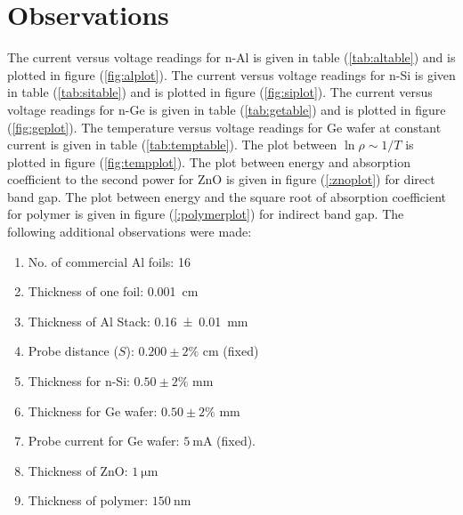 \documentclass[%
 aip,
 amsmath,amssymb,
 reprint,%
]{revtex4-1}
\begin{document}
\section{Observations}
The current versus voltage readings for n-Al is given in table (\ref{tab:altable}) and is plotted in figure (\ref{fig:alplot}). The current versus voltage readings for n-Si is given in table (\ref{tab:sitable}) and is plotted in figure (\ref{fig:siplot}). The current versus voltage readings for n-Ge is given in table (\ref{tab:getable}) and is plotted in figure (\ref{fig:geplot}). The temperature versus voltage readings for Ge wafer at constant current is given in table (\ref{tab:temptable}). The plot between $\ln \rho \sim 1/T$ is plotted in figure (\ref{fig:tempplot}). The plot between energy and absorption coefficient to the second power for ZnO is given in figure (\ref{:znoplot}) for direct band gap. The plot between energy and the square root of absorption coefficient for polymer is given in figure (\ref{:polymerplot}) for indirect band gap. The following additional observations were made:
\begin{enumerate}
    \item No. of commercial Al foils: 16
    \item Thickness of one foil: \SI{0.001}{\centi \metre}
    \item Thickness of Al Stack: \SI[separate-uncertainty=true]{0.16 \pm 0.01}{\milli \metre}
    \item Probe distance ($S$): $0.200 \pm 2\%$ cm (fixed)
    \item Thickness for n-Si: $0.50 \pm 2\%$ mm
    \item Thickness for Ge wafer: $0.50 \pm 2\%$ mm
    \item Probe current for Ge wafer: $\SI{5}{\milli \ampere}$ (fixed).
    \item Thickness of ZnO: $\SI{1}{\micro \metre}$
    \item Thickness of polymer: $\SI{150}{\nano \metre}$
\end{enumerate}
\end{document}
